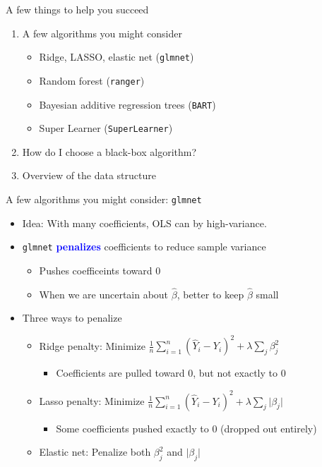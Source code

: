 \documentclass{beamer}
\newcommand\bblue[1]{\textcolor{blue}{\textbf{#1}}}
\begin{document}
\begin{frame}{A few things to help you succeed}
\begin{enumerate}
\item A few algorithms you might consider
\begin{itemize}
\item Ridge, LASSO, elastic net \hfill (\texttt{glmnet})
\item Random forest \hfill (\texttt{ranger})
\item Bayesian additive regression trees \hfill (\texttt{BART})
\item Super Learner \hfill (\texttt{SuperLearner})
\end{itemize}
\item How do I choose a black-box algorithm?
\item Overview of the data structure
\end{enumerate}
\end{frame}

\begin{frame}{A few algorithms you might consider: \texttt{glmnet}}
\begin{itemize}
\item Idea: With many coefficients, OLS can by high-variance.
\item \texttt{glmnet} \bblue{penalizes} coefficients to reduce sample variance
\begin{itemize}
\item Pushes coefficeints toward 0
\item When we are uncertain about $\hat\beta$, better to keep $\hat\beta$ small
\end{itemize}
\item Three ways to penalize
\begin{itemize}
\item Ridge penalty: Minimize $\frac{1}{n}\sum_{i=1}^n (\hat{Y}_i - Y_i)^2 + \lambda\sum_j \beta_j^2$
\begin{itemize}
\item Coefficients are pulled toward 0, but not exactly to 0
\end{itemize}
\item Lasso penalty: Minimize $\frac{1}{n}\sum_{i=1}^n (\hat{Y}_i - Y_i)^2 + \lambda\sum_j \lvert \beta_j\rvert$
\begin{itemize}
\item Some coefficients pushed exactly to 0 (dropped out entirely)
\end{itemize}
\item Elastic net: Penalize both $\beta_j^2$ and $\lvert \beta_j\rvert$
\end{itemize}
\end{itemize}
\end{frame}
\end{document}
